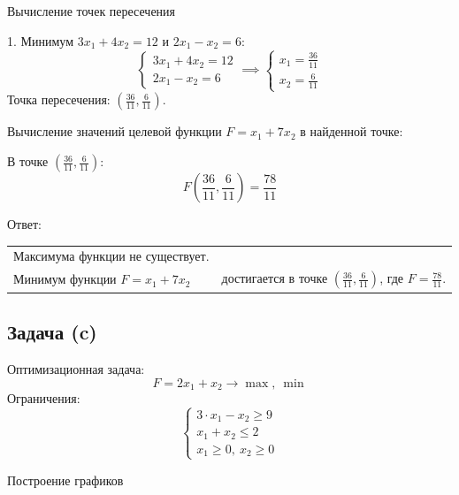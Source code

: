 \documentclass{article}
\begin{document}
Вычисление точек пересечения

1. Минимум \(3x_1 + 4x_2 = 12\) и \(2x_1 - x_2 = 6\):
\[
    \begin{cases}
        3x_1 + 4x_2 = 12 \\
        2x_1 - x_2 = 6
    \end{cases} \implies
    \begin{cases}
        x_1 = \frac{36}{11} \\
        x_2 = \frac{6}{11}
    \end{cases}
\]
Точка пересечения: \(\left(\frac{36}{11}, \frac{6}{11}\right)\).

Вычисление значений целевой функции \(F = x_1 + 7x_2\) в найденной точке:

В точке \(\left(\frac{36}{11}, \frac{6}{11}\right)\):
\[
    F\left(\frac{36}{11}, \frac{6}{11}\right) = \frac{78}{11}
\]

Ответ:
\begin{tabular}{l l}
    Максимума функции не существует.                                                                                                  \\
    Минимум функции \(F = x_1 + 7x_2\) & достигается в точке \(\left(\frac{36}{11}, \frac{6}{11}\right)\), где \(F = \frac{78}{11}\).
\end{tabular}

\newpage

\subsection{Задача (c)}

Оптимизационная задача:
\[
    F = 2x_1 + x_2 \to \max, \ \min
\]
Ограничения:
\[
    \begin{cases}
        3 \cdot x_1 - x_2 \geq 9 \\
        x_1 + x_2 \leq 2         \\
        x_1 \geq 0, \ x_2 \geq 0
    \end{cases}
\]

Построение графиков
\end{document}
